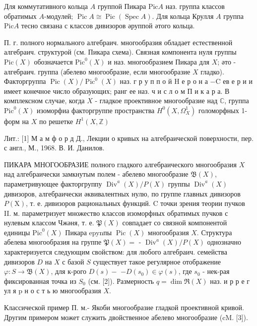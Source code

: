 \documentclass[10pt]{article}
\begin{document}
Для коммутативного кольца $A$ группой Пикара $\mathrm{Pic} A$ наз. группа классов обратимых $A$-модулей; $\operatorname{Pic} A \cong \operatorname{Pic}(\operatorname{Spec} A)$. Для кольца Крулля $A$ группа $\mathrm{Pic} A$ тесно связана с классов дивизоров әруппой әтого кольца.

П. г. полного нормального алгебраич. многообразия обладает естественной алгебраич. структурой (см. Пикара схема). Связная компонента нуля группы $\mathrm{Pic}(X)$ обозначается $\mathrm{Pic}^{0}(X)$ и наз. многообразием Пикара для $X$; әто - алгебраич. группа (абелево многообразие, если многообразие $X$ гладко). Факторгруппа $\operatorname{Pic}(X) / \operatorname{Pic}^{0}(X)$ наз. г р у п п о й $\mathrm{H}$ е р о н а $-\mathrm{C}$ ев е р и и имеет конечное число образующих; ранг ее наз. ч и с л о м П и к а р а. В комплексном случае, когда $X$ - гладкое проективное многообразие над $\mathbb{C}$, группа $\mathrm{Pic}^{0}(X)$ изоморфиа факторгруппе пространства $H^{0}\left(X, \Omega_{X}^{1}\right)$ голоморфных 1-форм на $X$ по решетке $H^{1}(X, \mathbb{Z})$

Лит.: [1] М а м ф о р д Д., Лекции о кривых на алгебраической поверхности, пер. с англ., М., 1968. В. И. Данилов.

ПИКАРА МНОГООБРАЗИЕ полного гладкого алгебраического многообразия $X$ над алгебраически замкнутым полем - абелево многообразие $\mathfrak{B}(X)$, параметривующее факторгруппу $\operatorname{Div}^{a}(X) / P(X)$ группы $\operatorname{Div}^{a}(X)$ дивизоров, алгебраически әквивалентных нулю, по группе главных дивизоров $P(\mathrm{X})$, т. е. дивизоров рациональных функций. $\mathrm{C}$ точки зрения теории пучков II. м. параметризует множество классов изоморфных обратимых пучков с нулевым классом Чжәня, т. е. $\mathfrak{P}(X)$ совпадает со связной компонентой единицы $\mathrm{Pic}^{0}(X)$ Пикара epynпы $\operatorname{Pic}(X)$ многообразия $X$. Структура абелева многообразия на группе $\mathfrak{P}(X)=$ - $\operatorname{Div}^{a}(X) / P(X)$ однозначно характеризуется следующим свойством: для любого алгебраич. семейства дивизоров $D$ на $X$ с базой $S$ существует такое регулярное отображение $\varphi: S \rightarrow \mathfrak{B}(X)$, для к-рого $D(s)-$ $-D\left(s_{0}\right) \in \varphi(s)$, где $s_{0}$ - нек-рая фиксированная точка из $S_{0}$ (см. [2]). Размерность $q=\operatorname{dim} \Re(X)$ наз. и р р е г ул я $\mathrm{p}$ н о с т ь ю многообразия $X$.

Классической пример П. м.- Якоби многообразие гладкой проективной кривой. Другим примером может служить двойственное абелево многообразие (cM. [3]).
\end{document}
